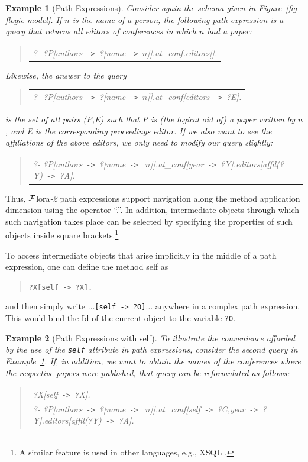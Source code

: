 \documentclass[11pt]{article}
\newcommand{\FLSYSTEM}{{\mbox{\sc ${\cal F}${lora}\rm\emph{-2}}}\xspace}
\newtheorem{example}{Example}[section]
\newenvironment{qrules}{\begin{quote}\tt\begin{tabular}[t]{l}}%
{\end{tabular}\end{quote}}
\newcommand{\mvd}{{\mbox{\tt \,->\,}}}  %
\newcommand{\anon}{?}
\begin{document}
\begin{example}[Path Expressions]\label{Ex:PathExpr}
  \rm Consider again the schema given in Figure~\ref{fig-flogic-model}.  If
  $n$ is the name of a person, the following path expression is a query
  that returns all editors of conferences in which $n$ had a paper:
  \begin{qrules}
   ?- ?P[authors\mvd\anon [name\mvd $n$]].at\_conf.editors[].
  \end{qrules}
  Likewise, the answer to the query
  \begin{qrules}
   ?- ?P[authors\mvd\anon [name\mvd $n$]].at\_conf[editors\mvd?E].
  \end{qrules}
  is the set of all pairs (\textsf{P},\textsf{E}) such that \textsf{P} is
  (the logical oid of) a paper written by $n$, and \textsf{E} is the
  corresponding proceedings editor.  If we also want to see the
  affiliations of the above editors, we only need to modify our query
  slightly:
  \begin{qrules}
   ?- ?P[authors\mvd\anon [name\mvd
    $n$]].at\_conf[year\mvd ?Y].editors[affil(?Y)\mvd ?A].
  \end{qrules}
\end{example}
Thus, \FLSYSTEM path expressions support navigation 
along the method application dimension using the operator
``.''.
In addition, intermediate objects through which such navigation
takes place can be selected by specifying the properties of such objects
inside square brackets.\footnote{
  A similar feature is used in other languages, e.g., XSQL \cite{xsql-92}.
  }

To access intermediate objects that arise implicitly in the middle
of a path expression, one can define the method \textsf{self} as
\begin{quote}
  {\tt ?X[self{\mvd}?X].} 
\end{quote}
and then simply write $\dots${\tt [self{\mvd}?O]}$\dots$ anywhere in a
complex path expression. This would bind the Id of the current object to
the variable {\tt ?O}.

\begin{example}[Path Expressions with \textsf{self}]\label{ex-path-self}
  \rm{
    To illustrate the convenience afforded by the use of the {\tt self}
    attribute in path expressions, consider the second query in
    Example~\ref{Ex:PathExpr}. If, in addition, we want to obtain the names
    of the conferences where the respective papers were published, that
    query can be reformulated as follows:
    }
  \begin{qrules}
    \hspace*{-12mm}
    ?X[self\mvd ?X].\\
    \hspace*{-12mm}
    ?- ?P[authors\mvd\anon[name\mvd
    $n$]].at\_conf[self\mvd ?C,year\mvd ?Y].editors[affil(?Y)\mvd ?A]. 
  \end{qrules}
\end{example}
\end{document}
